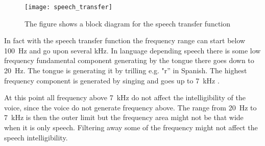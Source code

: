  \begin{figure}[H]
	\centering
		\texttt{[image: speech\_transfer]}
		\caption{The figure shows a block diagram for the speech transfer function \citep{pulkki2015}}
		\label{fig:speech_transfer_system}
\end{figure}


In fact with the speech transfer function the frequency range can start below \SI{100}{\hertz} and go upon several \si{\kilo\hertz}. In language depending speech there is some low frequency fundamental component generating by the tongue there goes down to \SI{20}{\hertz}. The tongue is generating it by trilling e.g. "r'' in Spanish. The highest frequency component is generated by singing and goes up to \SI{7}{\kilo\hertz} \citep{pulkki2015}.

At this point all frequency above  \SI{7}{\kilo\hertz} do not affect the intelligibility of the voice, since the voice do not generate frequency above. The range from \SI{20}{\hertz} to \SI{7}{\kilo\hertz} is then the outer limit but the frequency area might not be that wide when it is only speech. Filtering away some of the frequency might not affect the speech intelligibility. 

